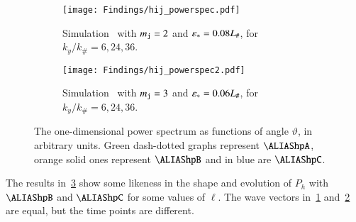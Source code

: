 
    \begin{figure}[h!]
        \centering
        \begin{subfigure}[b]{\linewidth}
            \centering
            \texttt{[image: Findings/hij\_powerspec.pdf]}
        \caption{Simulation~ with $m_{\mathtt{j}}=2$ and $\varepsilon_\ast=0.08L_\#$, for $k_y/k_\#=6,24,36$. }
        \label{fig:results:h11:hij_powerspec}
        \end{subfigure}
        \hfill
        \begin{subfigure}[b]{\linewidth}
            \texttt{[image: Findings/hij\_powerspec2.pdf]}
        \caption{Simulation~ with $m_{\mathtt{j}}=3$ and $\varepsilon_\ast=0.06L_\#$, for $k_y/k_\#=6,24,36$.}
        \label{fig:results:h11:hij_powerspec2}
        \end{subfigure}
        \caption{The one-dimensional power spectrum as functions of angle $\vartheta$, in arbitrary units. Green dash-dotted graphs represent $\hpA$, orange solid ones represent $\hpB$ and in blue are $\hpC$.}
        \label{fig:results:h11:hij_powerspecs}
    \end{figure}




    The results in~\cref{fig:results:h11:hij_powerspecs} show some likeness in the shape and evolution of $P_h$ with $\hpB$ and $\hpC$ for some values of $\ell$. The wave vectors in~\cref{fig:results:h11:hij_powerspec} and~\cref{fig:results:h11:hij_powerspec2} are equal, but the time points are different.

    















